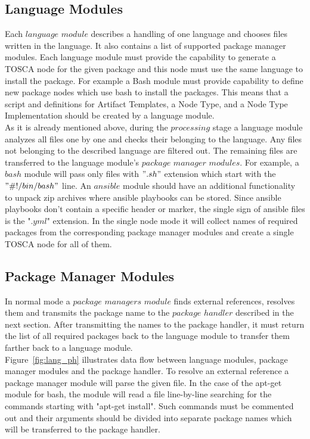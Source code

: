 \subsection{Language Modules} \label{subs:archlm}
Each $language$ $module$ describes a handling of one language and chooses files written in the language.
It also contains a list of supported package manager modules.
Each language module must provide the capability to generate a TOSCA node for the given package and this node must use the same language to install the package.
For example a Bash module must provide capability to define new package nodes which use bash to install the packages.
This means that a script and definitions for Artifact Templates, a Node Type, and a Node Type Implementation should be created by a language module.\\
As it is already mentioned above, during the $processing$ stage a language module analyzes all files one by one and checks their belonging to the language. 
Any files not belonging to the described language are filtered out.
The remaining files are transferred to the language module's $package$ $manager$ $modules$.
For example, a $bash$ module will pass only files with $".sh"$ extension which start with the $"\#!/bin/bash"$ line.
An $ansible$ module should have an additional functionality to unpack zip archives where ansible playbooks can be stored.
Since ansible playbooks don't contain a specific header or marker, the single sign of ansible files is the "$.yml$" extension. 
In the single node mode it will collect names of required packages from the corresponding package manager modules and create a single TOSCA node for all of them.

\subsection{Package Manager Modules} \label{subs:archpmm}
In normal mode a $package$ $managers$ $module$ finds external references, resolves them and transmits the package name to the $package$ $handler$ described in the next section.
After transmitting the names to the package handler, it must return the list of all required packages back to the language module to transfer them farther back to a language module.\\
Figure~\ref{fig:lang_ph} illustrates data flow between language modules, package manager modules and the package handler.
To resolve an external reference a package manager module will parse the given file. 
In the case of the apt-get module for bash, the module will read a file line-by-line searching for the commands starting with "apt-get install".
Such commands must be commented out and their arguments should be divided into separate package names which will be transferred to the package handler. 


